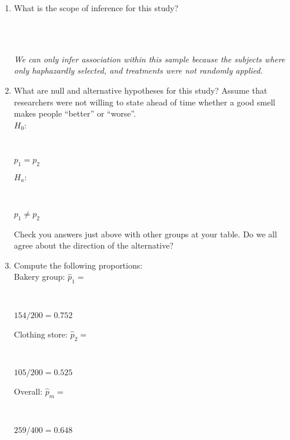 \begin{enumerate}
\begin{key}
\end{key}
   \item  What is the scope of inference for this study? 
\begin{students}
 \vspace{1cm}\\
\end{students}
\begin{key}
 \\ {\it  We can only infer association within this sample because the
   subjects where only haphazardly selected, and treatments were not
   randomly applied.}
\end{key}

\item \label{Bake-hypotheses}What are null and alternative hypotheses
  for this study? Assume that researchers were not willing to state
  ahead of time whether a good smell makes people ``better'' or ``worse''. \\
  $H_0:$\
\begin{students}
 \vspace{1cm}\\
\end{students}
\begin{key}
 $p_1 = p_2$ \\
\end{key}
   $H_a: $
\begin{students}
     \vspace{1cm}\\
\end{students}
\begin{key}
   $ p_1 \neq p_2$ \\
\end{key}   

     Check you  answers just above with other groups at your table.
     Do we all agree about the direction of the alternative?  
\item Compute the following proportions:\\
    Bakery group:  $\widehat{p}_1 = $
\begin{students}
 \vspace{1cm}\\
\end{students}
\begin{key}
  $154/200 = 0.752$ \\
\end{key}
Clothing store: $\widehat{p}_2 = $
\begin{students}
 \vspace{1cm}\\
\end{students}
\begin{key}
  $105/200 = 0.525$ \\
\end{key}
    Overall: $\widehat{p}_m = $
\begin{students}
 \vspace{1cm}\\
\end{students}
\begin{key}
  $259/400 = 0.648$ \\
\end{key}


\end{enumerate}
